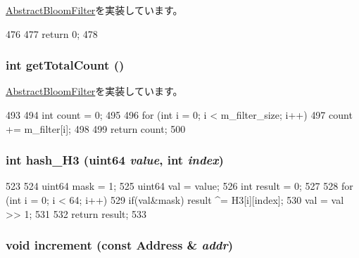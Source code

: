 \hyperlink{classAbstractBloomFilter_a4dd174ae24a8237d41cf0b02c78b896d}{AbstractBloomFilter}を実装しています。


\begin{DoxyCode}
476 {
477     return 0;
478 }
\end{DoxyCode}
\hypertarget{classH3BloomFilter_a97f66183ea41a7c123bab9dd5313a74a}{
\subsubsection[{getTotalCount}]{\setlength{\rightskip}{0pt plus 5cm}int getTotalCount ()}}
\label{classH3BloomFilter_a97f66183ea41a7c123bab9dd5313a74a}


\hyperlink{classAbstractBloomFilter_a25ea5e1ef3d4911226f37649b6efed22}{AbstractBloomFilter}を実装しています。


\begin{DoxyCode}
493 {
494     int count = 0;
495 
496     for (int i = 0; i < m_filter_size; i++) {
497         count += m_filter[i];
498     }
499     return count;
500 }
\end{DoxyCode}
\hypertarget{classH3BloomFilter_aa179f17d2bcd7c5f737f76269c080610}{
\subsubsection[{hash\_\-H3}]{\setlength{\rightskip}{0pt plus 5cm}int hash\_\-H3 ({\bf uint64} {\em value}, \/  int {\em index})}}
\label{classH3BloomFilter_aa179f17d2bcd7c5f737f76269c080610}



\begin{DoxyCode}
523 {
524     uint64 mask = 1;
525     uint64 val = value;
526     int result = 0;
527 
528     for (int i = 0; i < 64; i++) {
529         if(val&mask) result ^= H3[i][index];
530         val = val >> 1;
531     }
532     return result;
533 }
\end{DoxyCode}
\hypertarget{classH3BloomFilter_a3e860ad851b771ac3b6eeb1716eb56bc}{
\subsubsection[{increment}]{\setlength{\rightskip}{0pt plus 5cm}void increment (const {\bf Address} \& {\em addr})}}
\label{classH3BloomFilter_a3e860ad851b771ac3b6eeb1716eb56bc}


